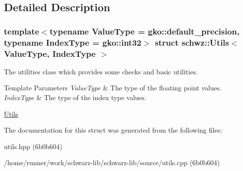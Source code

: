 \subsection{Detailed Description}
\subsubsection*{template$<$typename Value\+Type = gko\+::default\+\_\+precision, typename Index\+Type = gko\+::int32$>$\newline
struct schwz\+::\+Utils$<$ Value\+Type, Index\+Type $>$}

The utilities class which provides some checks and basic utilities. 


\begin{DoxyTemplParams}{Template Parameters}
{\em Value\+Type} & The type of the floating point values. \\
\hline
{\em Index\+Type} & The type of the index type values.\\
\hline
\end{DoxyTemplParams}
\hyperlink{group__utils}{Utils} 

The documentation for this struct was generated from the following files\+:\begin{DoxyCompactItemize}
\item 
utils.\+hpp (6b0b604)\item 
/home/runner/work/schwarz-\/lib/schwarz-\/lib/source/utils.\+cpp (6b0b604)\end{DoxyCompactItemize}
